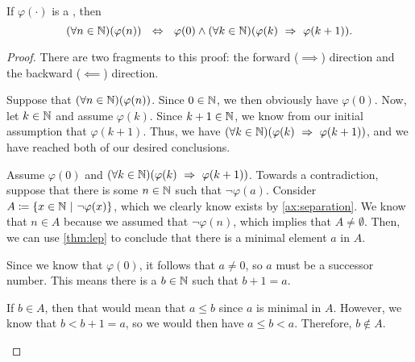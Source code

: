 \begin{theorem}\label{thm:weakinduction}
    If \(\varphi(\cdot)\) is a {\wff}, then
    \[
        \pn*{\forall n \in \N}\pn*{\varphi(n)}
        ~\iff~ \varphi(0) \meet \pn*{\forall k \in \N}\pn*{\varphi(k) \implies \varphi(k + 1)}.
    \]
\end{theorem}
\begin{proof}
    There are two fragments to this proof:
    the forward (\(\implies\)) direction and the backward (\(\impliedby\)) direction.

    \begin{case}
        Suppose that \(\pn*{\forall n \in \N}\pn*{\varphi(n)}\).
        Since \(0 \in \mathbb{N}\), we then obviously have \(\varphi(0)\).
        Now, let \(k \in \mathbb{N}\) and assume \(\varphi(k)\).
        Since \(k + 1 \in \mathbb{N}\), we know from our initial assumption that \(\varphi(k + 1)\).
        Thus, we have \(\pn*{\forall k \in \N}\pn*{\varphi(k) \implies \varphi(k + 1)}\),
        and we have reached both of our desired conclusions.
    \end{case}

    \begin{case}
        Assume \(\varphi(0)\) and \(\pn*{\forall k \in \N}\pn*{\varphi(k) \implies \varphi(k + 1)}\).
        Towards a contradiction,
        suppose that there is some \(n \in \mathbb{N}\) such that \(\neg \varphi(a)\).
        Consider \(A \defn \set*{x \in \N \suchthat \neg \varphi(x)}\),
        which we clearly know exists by \autoref{ax:separation}.
        We know that \(n \in A\) because we assumed that \(\neg \varphi(n)\),
        which implies that \(A \neq \emptyset\).
        Then, we can use \autoref{thm:lep} to conclude that there is a minimal element \(a\) in \(A\).

        Since we know that \(\varphi(0)\), it follows that \(a \neq 0\), so \(a\) must be a successor number.
        This means there is a \(b \in \mathbb{N}\) such that \(b + 1 = a\).

        If \(b \in A\), then that would mean that \(a \leq b\) since \(a\) is minimal in \(A\).
        However, we know that \(b < b + 1 = a\), so we would then have \(a \leq b < a\). \contradiction
        Therefore, \(b \not \in A\).

    \end{case}
\end{proof}

